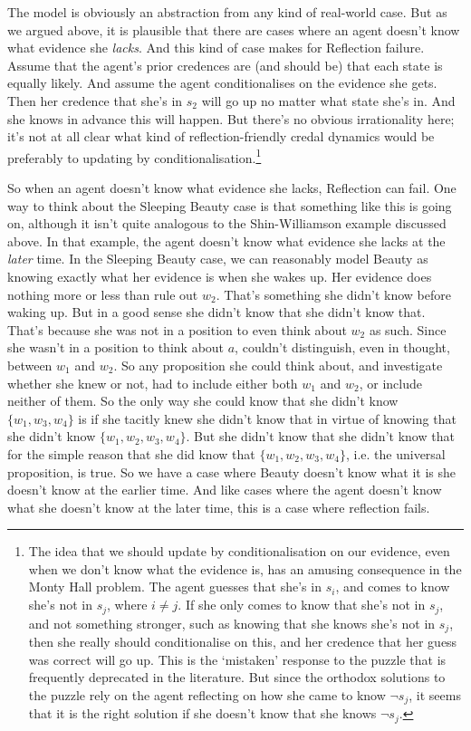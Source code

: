 The model is obviously an abstraction from any kind of real-world case. But as we argued above, it is plausible that there are cases where an agent doesn't know what evidence she \textit{lacks}. And this kind of case makes for Reflection failure. Assume that the agent's prior credences are (and should be) that each state is equally likely. And assume the agent conditionalises on the evidence she gets. Then her credence that she's in \(s_2\) will go up no matter what state she's in. And she knows in advance this will happen. But there's no obvious irrationality here; it's not at all clear what kind of reflection-friendly credal dynamics would be preferably to updating by conditionalisation.\footnote{The idea that we should update by conditionalisation on our evidence, even when we don't know what the evidence is, has an amusing consequence in the Monty Hall problem. The agent guesses that she's in \(s_i\), and comes to know she's not in \(s_j\), where \(i \neq j\). If she only comes to know that she's not in \(s_j\), and not something stronger, such as knowing that she knows she's not in \(s_j\), then she really should conditionalise on this, and her credence that her guess was correct will go up. This is the `mistaken' response to the puzzle that is frequently deprecated in the literature. But since the orthodox solutions to the puzzle rely on the agent reflecting on how she came to know \(\neg s_j\), it seems that it is the right solution if she doesn't know that she knows \(\neg s_j\).}

So when an agent doesn't know what evidence she lacks, Reflection can fail. One way to think about the Sleeping Beauty case is that something like this is going on, although it isn't quite analogous to the Shin-Williamson example discussed above. In that example, the agent doesn't know what evidence she lacks at the \textit{later} time. In the Sleeping Beauty case, we can reasonably model Beauty as knowing exactly what her evidence is when she wakes up. Her evidence does nothing more or less than rule out \(w_2\). That's something she didn't know before waking up. But in a good sense she didn't know that she didn't know that. That's because she was not in a position to even think about \(w_2\) as such. Since she wasn't in a position to think about \(a\), couldn't distinguish, even in thought, between \(w_1\) and \(w_2\). So any proposition she could think about, and investigate whether she knew or not, had to include either both \(w_1\) and \(w_2\), or include neither of them. So the only way she could know that she didn't know \(\{w_1, w_3, w_4\}\) is if she tacitly knew she didn't know that in virtue of knowing that she didn't know \(\{w_1, w_2, w_3, w_4\}\). But she didn't know that she didn't know that for the simple reason that she did know that \(\{w_1, w_2, w_3, w_4\}\), i.e. the universal proposition, is true. So we have a case where Beauty doesn't know what it is she doesn't know at the earlier time. And like cases where the agent doesn't know what she doesn't know at the later time, this is a case where reflection fails.

